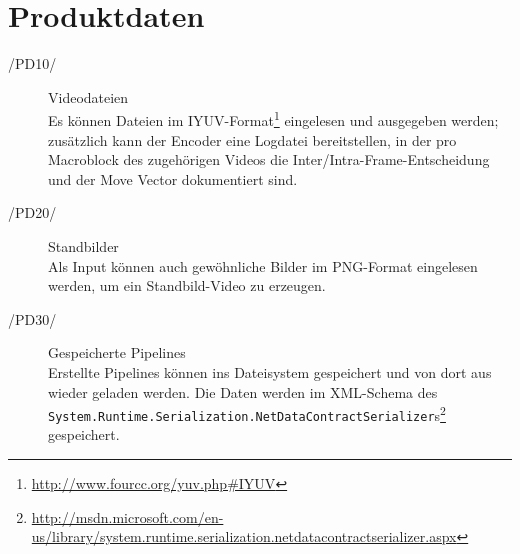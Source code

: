 \section{Produktdaten}
\label{sec:produktdaten}

\begin{description}
	\item[/PD10/] Videodateien \\
        Es können Dateien im IYUV-Format\footnote{\url{http://www.fourcc.org/yuv.php\#IYUV}} eingelesen und ausgegeben werden; zusätzlich kann der Encoder eine Logdatei bereitstellen, in der pro Macroblock des zugehörigen Videos die Inter/Intra-Frame-Entscheidung und der Move Vector dokumentiert sind.
	\item[/PD20/] Standbilder \\
        Als Input können auch gewöhnliche Bilder im PNG-Format eingelesen werden, um ein Standbild-Video zu erzeugen.
	\item[/PD30/] Gespeicherte Pipelines \\
        \sloppy Erstellte Pipelines können ins Dateisystem gespeichert und von dort aus wieder geladen werden. Die Daten werden im XML-Schema des \texttt{System.Runtime.Serialization.NetDataContractSerializer}s\footnote{\url{http://msdn.microsoft.com/en-us/library/system.runtime.serialization.netdatacontractserializer.aspx}} gespeichert.
\end{description} \fussy
